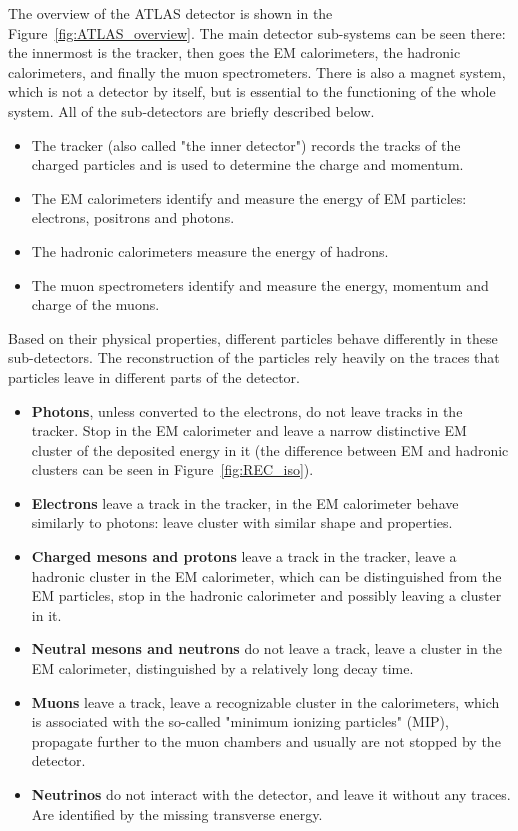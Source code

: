 The overview of the ATLAS detector is shown in the Figure~\ref{fig:ATLAS_overview}. The main detector sub-systems can be seen there: the innermost is the tracker, then goes the EM calorimeters, the hadronic calorimeters, and finally the muon spectrometers. There is also a magnet system, which is not a detector by itself, but is essential to the functioning of the whole system. All of the sub-detectors are briefly described below.

\begin{itemize}
\item The tracker (also called "the inner detector") records the tracks of the charged particles and is used to determine the charge and momentum.
\item The EM calorimeters identify and measure the energy of EM particles: electrons, positrons and photons.
\item The hadronic calorimeters measure the energy of hadrons.
\item The muon spectrometers identify and measure the energy, momentum and charge of the muons.
\end{itemize}

Based on their physical properties, different particles behave differently in these sub-detectors. The reconstruction of the particles rely heavily on the traces that particles leave in different parts of the detector.

\begin{itemize}
\item {\bfseries Photons}, unless converted to the electrons, do not leave tracks in the tracker. Stop in the EM calorimeter and leave a narrow distinctive EM cluster of the deposited energy in it (the difference between EM and hadronic clusters can be seen in Figure~\ref{fig:REC_iso}).
\item {\bfseries Electrons} leave a track in the tracker, in the EM calorimeter behave similarly to photons: leave cluster with similar shape and properties.
\item {\bfseries Charged mesons and protons} leave a track in the tracker, leave a hadronic cluster in the EM calorimeter, which can be distinguished from the EM particles, stop in the hadronic calorimeter and possibly leaving a cluster in it.
\item {\bfseries Neutral mesons and neutrons} do not leave a track, leave a cluster in the EM calorimeter, distinguished by a relatively long decay time.
\item {\bfseries Muons} leave a track, leave a recognizable cluster in the calorimeters, which is associated with the so-called "minimum ionizing particles" (MIP), propagate further to the muon chambers and usually are not stopped by the detector.
\item {\bfseries Neutrinos} do not interact with the detector, and leave it without any traces. Are identified by the missing transverse energy.
\end{itemize}

